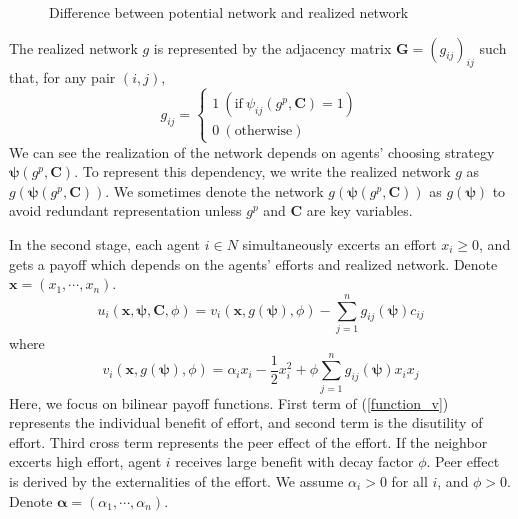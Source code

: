 \documentclass[12pt]{article}
\theoremstyle{definition}
\newcommand{\bm}[1]{\boldsymbol{#1}}
\begin{document}
\begin{figure}[h]
\caption{Difference between potential network and realized network} \label{fig:dif}
\end{figure}

The realized network $g$ is represented by the adjacency matrix $\bm{G} = {(g_{ij})}_{ij}$ such that, for any pair $(i,j)$,
\[ g_{ij} = 
	\begin{cases}
		1 \  (\text{if} \  \psi_{ij}(g^p, {\bm{C}}) = 1 ) \\
		0 \  (\text{otherwise})
	\end{cases} \]
We can see the realization of the network depends on agents' choosing strategy $\bm{\psi}(g^p, \bm{C})$.
To represent this dependency, we write the realized network $g$ as $g(\bm{\psi}(g^p, \bm{C}))$.
We sometimes denote the network $g(\bm{\psi}(g^p, \bm{C}))$ as $g(\bm{\psi})$ to avoid redundant representation unless $g^p$ and $\bm{C}$ are key variables.

In the second stage, each agent $i \in N$ simultaneously excerts an effort $x_i \ge 0$, and gets a payoff which depends on the agents' efforts and realized network.
Denote $\bm{x} = (x_1, \cdots, x_n)$.
\[ u_i(\bm{x}, \bm{\psi}, \bm{C}, \phi) = v_i(\bm{x}, g(\bm{\psi}), \phi) - \sum_{j=1}^n g_{ij}(\bm{\psi}) c_{ij} \]
where
\begin{equation}
\label{function_v}
	v_i(\bm{x}, g(\bm{\psi}), \phi) = \alpha_i x_i - \frac{1}{2} x_i^2 + \phi \sum_{j=1}^n g_{ij}(\bm{\psi}) x_i x_j
\end{equation}
Here, we focus on bilinear payoff functions.
First term of (\ref{function_v}) represents the individual benefit of effort, and second term is the disutility of effort.
Third cross term represents the peer effect of the effort.
If the neighbor excerts high effort, agent $i$ receives large benefit with decay factor $\phi$.
Peer effect is derived by the externalities of the effort.
We assume $\alpha_i > 0$ for all $i$, and $\phi > 0$.
Denote $\bm{\alpha} = (\alpha_1, \cdots, \alpha_n)$.
\end{document}
